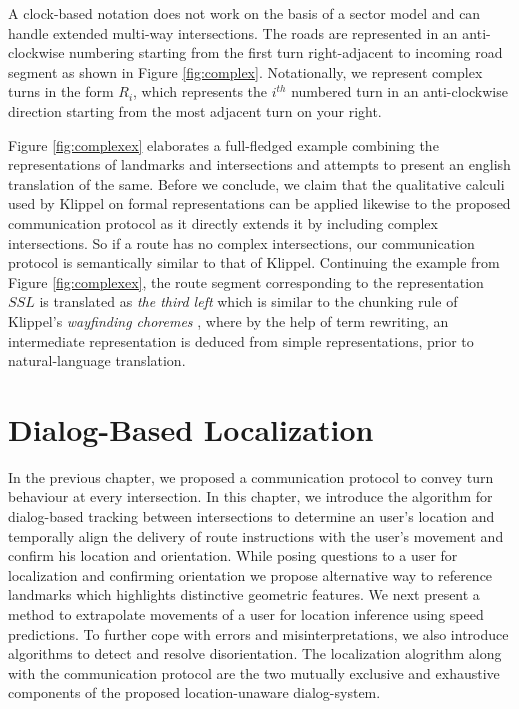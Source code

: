 \documentclass{iitkthesis}
\begin{document}
A clock-based notation does not work on the basis of a sector model and can 
handle extended multi-way intersections. The roads are represented in an 
anti-clockwise numbering starting from the first turn right-adjacent to 
incoming road segment as shown in Figure \ref{fig:complex}. Notationally, 
we represent complex turns in the form $R_i$, which represents the 
$i^{th}$ numbered turn in an anti-clockwise direction starting from the most 
adjacent turn on your right.

Figure \ref{fig:complexex} elaborates a full-fledged example combining 
the representations of landmarks and intersections and attempts to 
present an english translation of the same. Before we conclude, we claim 
that the qualitative calculi used by Klippel \cite{klippel} on formal 
representations can be applied likewise to the proposed communication 
protocol as it directly extends it by including 
complex intersections. So if a route has no complex intersections, our 
communication protocol is semantically similar to that of Klippel. 
Continuing the example from Figure \ref{fig:complexex}, the route 
segment corresponding to the representation $SSL$ is translated as 
\textit{the third left} which is similar to the chunking rule of 
Klippel's \textit{wayfinding choremes} \cite{klippel}, where by the help 
of term rewriting, an intermediate representation is deduced from simple 
representations, prior to natural-language translation.


 \chapter{Dialog-Based Localization}

In the previous chapter, we proposed a communication protocol to convey 
turn behaviour at every intersection. In this chapter, we introduce the 
algorithm for dialog-based tracking between intersections to 
determine an user's location and temporally align the delivery of route 
instructions with the user's movement and confirm his location and 
orientation. While posing questions to a user for localization and 
confirming orientation we propose alternative way to reference 
landmarks which highlights distinctive geometric features. We next 
present a method to extrapolate movements of a user for location 
inference using speed predictions. To further cope with errors and 
misinterpretations, we also introduce algorithms to detect and 
resolve disorientation. The localization alogrithm along with the 
communication protocol are the two mutually exclusive and exhaustive 
components of the proposed location-unaware dialog-system. 
\end{document}
